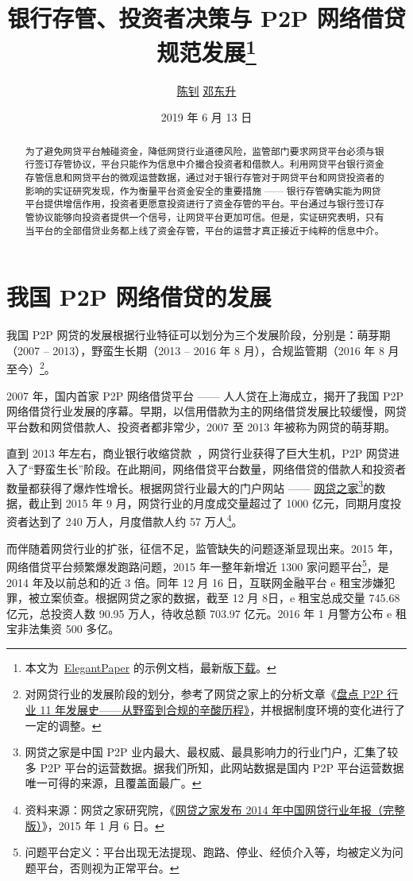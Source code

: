 \documentclass[lang=cn,11pt,authoryear]{elegantpaper}
\title{银行存管、投资者决策与 P2P 网络借贷规范发展\footnote{本文为~\href{https://github.com/ElegantLaTeX/ElegantPaper}{ElegantPaper} 的示例文档，最新版\href{https://github.com/EthanDeng/bank-custody}{下载}。}}
\author{\href{http://www.cces.fudan.edu.cn/researchdetail.aspx?id=6}{陈钊} \quad \href{https://ddswhu.me/}{邓东升}}
\institute{复旦大学 \; 经济学院\\ 中国社会主义市场经济研究中心}
\date{2019 年 6 月 13 日}
\begin{document}
\maketitle

\begin{abstract}
为了避免网贷平台触碰资金，降低网贷行业道德风险，监管部门要求网贷平台必须与银行签订存管协议，平台只能作为信息中介撮合投资者和借款人。利用网贷平台银行资金存管信息和网贷平台的微观运营数据，通过对于银行存管对于网贷平台和网贷投资者的影响的实证研究发现，作为衡量平台资金安全的重要措施 —— 银行存管确实能为网贷平台提供增信作用，投资者更愿意投资进行了资金存管的平台。平台通过与银行签订存管协议能够向投资者提供一个信号，让网贷平台更加可信。但是，实证研究表明，只有当平台的全部借贷业务都上线了资金存管，平台的运营才真正接近于纯粹的信息中介。
\end{abstract}

\section{我国 P2P 网络借贷的发展}
我国 P2P 网贷的发展根据行业特征可以划分为三个发展阶段，分别是：萌芽期（2007 -- 2013），野蛮生长期（2013 -- 2016 年 8 月），合规监管期（2016 年 8 月至今）\footnote{对网贷行业的发展阶段的划分，参考了网贷之家上的分析文章《\href{https://www.wdzj.com/zhuanlan/guancha/17-10089-1.html}{盘点 P2P 行业 11 年发展史——从野蛮到合规的辛酸历程》}，并根据制度环境的变化进行了一定的调整。}。

2007 年，国内首家 P2P 网络借贷平台 —— 人人贷在上海成立，揭开了我国 P2P 网络借贷行业发展的序幕。早期，以信用借款为主的网络借贷发展比较缓慢，网贷平台数和网贷借款人、投资者都非常少，2007 至 2013 年被称为网贷的萌芽期。

直到 2013 年左右，商业银行收缩贷款~\citep{pmm2014}，网贷行业获得了巨大生机，P2P 网贷进入了“野蛮生长”阶段。在此期间，网络借贷平台数量，网络借贷的借款人和投资者数量都获得了爆炸性增长。根据网贷行业最大的门户网站 —— \href{https://www.wdzj.com/}{网贷之家}\footnote{网贷之家是中国 P2P 业内最大、最权威、最具影响力的行业门户，汇集了较多 P2P 平台的运营数据。据我们所知，此网站数据是国内 P2P 平台运营数据唯一可得的来源，且覆盖面最广。}的数据，截止到 2015 年 9 月，网贷行业的月度成交量超过了 1000 亿元，同期月度投资者达到了 240 万人，月度借款人约 57 万人\footnote{资料来源：网贷之家研究院，《\href{https://www.wdzj.com/news/baogao/16305.html}{网贷之家发布 2014 年中国网贷行业年报（完整版）}》，2015 年 1 月 6 日。}。

而伴随着网贷行业的扩张，征信不足，监管缺失的问题逐渐显现出来。2015 年，网络借贷平台频繁爆发跑路问题，2015 年一整年新增近 1300 家问题平台\footnote{问题平台定义：平台出现无法提现、跑路、停业、经侦介入等，均被定义为问题平台，否则视为正常平台。}，是 2014 年及以前总和的近 3 倍。同年 12 月 16 日，互联网金融平台 e 租宝涉嫌犯罪，被立案侦查。根据网贷之家的数据，截至 12 月 8日，e 租宝总成交量 745.68 亿元，总投资人数 90.95 万人，待收总额 703.97 亿元。2016 年 1 月警方公布 e 租宝非法集资 500 多亿。
\end{document}
